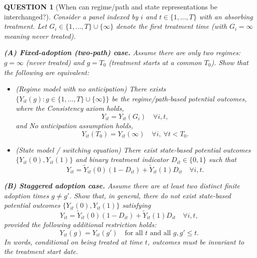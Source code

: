 \documentclass[12pt]{article}
\renewcommand{\(}{\left(}%
\renewcommand{\)}{\right)}%
\renewcommand{\[}{\left[}%
\renewcommand{\]}{\right]}%
\newtheorem{question}{QUESTION}[section]}
\begin{document}
\begin{question}[When can regime/path and state representations be interchanged?]
Consider a panel indexed by $i$ and $t\in\{1,\dots,T\}$ with an absorbing treatment.
Let $G_i\in\{1,\dots,T\}\cup\{\infty\}$ denote the first treatment time (with $G_i=\infty$ meaning never treated). 

\medskip
\noindent
\textbf{(A) Fixed-adoption (two-path) case.}
Assume there are only two regimes: $g=\infty$ (never treated) and $g=T_0$ (treatment starts at a common $T_0$).
Show that the following are equivalent:
\begin{itemize}
\item[(i)] (Regime model with no anticipation) There exists $\{Y_{it}(g): g\in\{1,\dots,T\}\cup\{\infty\}\}$ be the regime/path-based potential outcomes, where the \emph{Consistency axiom} holds,
\begin{equation*}
Y_{it}=Y_{it}(G_i)\quad \forall i,t,
\end{equation*}
and \emph{No anticipation assumption} holds,
\begin{equation*}
Y_{it}(T_0)=Y_{it}(\infty)\quad \forall i,\ \forall t<T_0 .
\end{equation*}
\item[(ii)] (State model / switching equation) There exist state-based potential outcomes
$\{Y_{it}(0),Y_{it}(1)\}$ and binary treatment indicator $D_{it}\in\{0,1\}$ such that
\begin{equation*}
Y_{it}=\widetilde Y_{it}(0)(1-D_{it})+\widetilde Y_{it}(1)D_{it}\quad \forall i,t .
\end{equation*}
\end{itemize}

\medskip
\noindent
\textbf{(B) Staggered adoption case.}
Assume there are at least two distinct finite adoption times $g\neq g'$.
Show that, in general, there do \emph{not} exist state-based potential outcomes
$\{Y_{it}(0),Y_{it}(1)\}$ satisfying
\begin{equation*}
Y_{it}=\widetilde Y_{it}(0)(1-D_{it})+\widetilde Y_{it}(1)D_{it}\quad \forall i,t,
\end{equation*}
provided the following additional restriction holds:
\begin{equation*}
\boxed{
Y_{it}(g)=Y_{it}(g') \quad \text{for all } t \text{ and all } g,g'\le t .
}
\end{equation*}
In words, conditional on being treated at time $t$, outcomes must be invariant to the
treatment start date.
\end{question}
\end{document}
